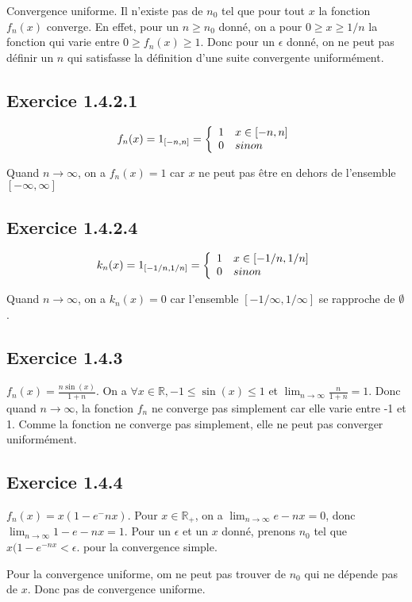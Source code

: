 \documentclass[]{book}
\theoremstyle{definition}
\newcommand{\bb}[1]{\mathbb{#1}}
\newcommand{\R}{\bb{R}}
\begin{document}
Convergence uniforme. Il n'existe pas de $n_0$ tel que pour tout $x$ la fonction $f_n(x)$ converge. En effet, pour un $n \geq n_0$ donn\'e, on a pour $0 \geq x \geq 1/n$ la fonction qui varie entre $0 \geq f_n(x) \geq 1$. Donc pour un $\epsilon$ donn\'e, on ne peut pas d\'efinir un $n$ qui satisfasse la d\'efinition d'une suite convergente uniform\'ement.   

\subsection*{Exercice 1.4.2.1}
$$
f_n(x) = 1_{[-n, n]} = 
\left\{
\begin{array}{l l}
1 & x \in [-n,n] \\
0 & sinon
\end{array}
\right.
$$

Quand $n \to \infty$, on a $f_n(x) = 1$ car $x$ ne peut pas \^etre en dehors de l'ensemble $[-\infty, \infty]$


\subsection*{Exercice 1.4.2.4}
$$
k_n(x) = 1_{[-1/n, 1/n]} = 
\left\{
\begin{array}{l l}
1 & x \in [-1/n,1/n] \\
0 & sinon
\end{array}
\right.
$$

Quand $n \to \infty$, on a $k_n(x) = 0$ car l'ensemble $[-1/\infty, 1/\infty]$ se rapproche de $\emptyset$.

\subsection*{Exercice 1.4.3}
$f_n(x) = \frac{n \sin(x)}{1+n}$. On a $\forall x \in \R, -1 \leq \sin(x) \leq 1$ et $\lim_{n \to \infty} {\frac{n}{1+n}} = 1$. Donc quand $n \to \infty$, la fonction $f_n$ ne converge pas simplement car elle varie entre -1 et 1. Comme la fonction ne converge pas simplement, elle ne peut pas converger uniform\'ement.

\subsection*{Exercice 1.4.4}
$f_n(x) = x(1-e^-{nx})$. Pour $x \in \R_{+}$, on a $\lim_{n \to \infty}{ e-{nx}} = 0$, donc $\lim_{n \to \infty}{1 - e-{nx}} = 1$. Pour un $\epsilon$ et un $x$ donn\'e, prenons $n_0$ tel que $x(1-e^{-nx}<\epsilon$. pour la convergence simple.

Pour la convergence uniforme, om ne peut pas trouver de $n_0$ qui ne d\'epende pas de $x$. Donc pas de convergence uniforme.
\end{document}
